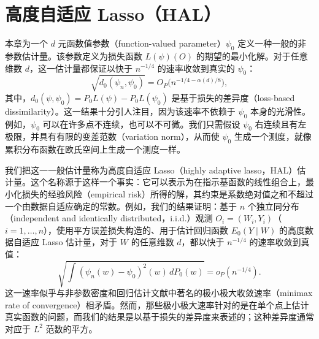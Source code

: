 \chapter{高度自适应 Lasso（HAL）}
\begingroup
\raggedbottom
\label{ch:highly-adaptive-lasso}

本章为一个 $d$ 元函数值参数（function-valued parameter）$\psi_0$ 定义一种一般的非参数估计量。该参数定义为损失函数 $L(\psi)(O)$ 的期望的最小化解。对于任意维数 $d$，这一估计量都保证以快于 $n^{-1/4}$ 的速率收敛到真实的 $\psi_0$：
\[
 \sqrt{d_0(\psi_n,\psi_0)}
   =O_P\bigl(n^{-1/4-\alpha(d)/8}\bigr),
\]
其中，$d_0(\psi,\psi_0)=P_0L(\psi)-P_0L(\psi_0)$ 是基于损失的差异度（loss-based dissimilarity）。这一结果十分引人注目，因为该速率不依赖于 $\psi_0$ 本身的光滑性。例如，$\psi_0$ 可以在许多点不连续，也可以不可微。我们只需假设 $\psi_0$ 右连续且有左极限，并具有有限的变差范数（variation norm），从而使 $\psi_0$ 生成一个测度，就像累积分布函数在欧氏空间上生成一个测度一样。

\begin{sourcebox}
我们把这一一般估计量称为高度自适应 Lasso（highly adaptive lasso，HAL）估计量。这个名称源于这样一个事实：它可以表示为在指示基函数的线性组合上，最小化损失的经验风险（empirical risk）所得的解，其约束是系数绝对值之和不超过一个由数据自适应确定的常数。例如，我们的结果证明：基于 $n$ 个独立同分布（independent and identically distributed，i.i.d.）观测 $O_i=(W_i,Y_i)$（$i=1,\ldots,n$），使用平方误差损失构造的、用于估计回归函数 $E_0(Y\mid W)$ 的高度数据自适应 Lasso 估计量，对于 $W$ 的任意维数 $d$，都以快于 $n^{-1/4}$ 的速率收敛到真值：
\[
 \sqrt{\int(\psi_n(w)-\psi_0)^2(w)\,dP_0(w)}
   =o_P(n^{-1/4}).
\]
这一速率似乎与非参数密度和回归估计文献中著名的极小极大收敛速率（minimax rate of convergence）相矛盾。然而，那些极小极大速率针对的是在单个点上估计真实函数的问题，而我们的结果是以基于损失的差异度来表述的；这种差异度通常对应于 $L^2$ 范数的平方。
\end{sourcebox}

